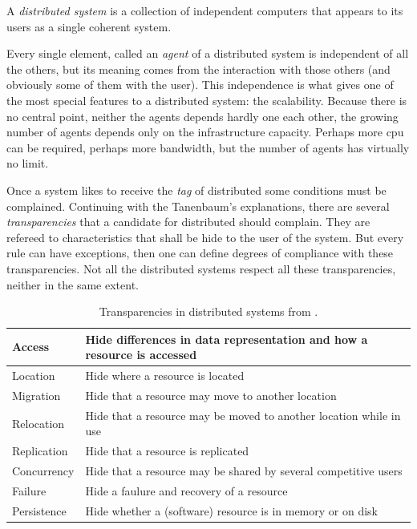 \documentclass[10pt,a4paper,twoside]{llncs}
\begin{document}
\begin{definition}\label{def:distributedSystem}
    A \emph{distributed system} is a collection of independent computers that appears to its users as a single coherent system.
\end{definition}

Every single element, called an \emph{agent} of a distributed system is independent of all the others, but its meaning comes from the interaction with those others (and obviously some of them with the user). This independence is what gives one of the most special features to a distributed system: the scalability. Because there is no central point, neither the agents depends hardly one each other, the growing number of agents depends only on the infrastructure capacity. Perhaps more cpu can be required, perhaps more bandwidth, but the number of agents has virtually no limit.

Once a system likes to receive the \emph{tag} of distributed some conditions must be complained. Continuing with the Tanenbaum's explanations, there are several \emph{transparencies} that a candidate for distributed should complain. They are refereed to characteristics that shall be hide to the user of the system. But every rule can have exceptions, then one can define degrees of compliance with these transparencies. Not all the distributed systems respect all these transparencies, neither in the same extent.

\begin{table}[h]
    \begin{center}
        \begin{tabular}{|l|l|}
            \hline
            Access & Hide differences in data representation and how a resource is accessed \\ \hline
            Location & Hide where a resource is located \\ \hline
            Migration & Hide that a resource may move to another location \\ \hline
            Relocation & Hide that a resource may be moved to another location while in use \\ \hline
            Replication & Hide that a resource is replicated \\ \hline
            Concurrency & Hide that a resource may be shared by several competitive users \\ \hline
            Failure & Hide a faulure and recovery of a resource \\ \hline
            Persistence & Hide whether a (software) resource is in memory or on disk \\ \hline
        \end{tabular}
        \caption{Transparencies in distributed systems from \cite{TanenbaumDistr}.}\label{tab:transparencies}
    \end{center}
\end{table}
\end{document}
